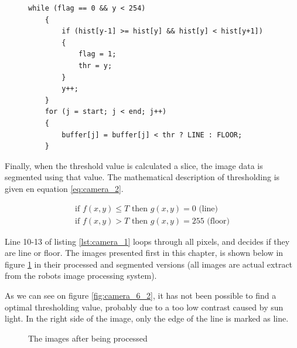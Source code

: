\lstset{language=C,basicstyle=\tiny,numbers=left}
\begin{figure}
\begin{lstlisting}[frame=single,caption=Part of the thresholding code,label=lst:camera_1]
	while (flag == 0 && y < 254)
	{
		if (hist[y-1] >= hist[y] && hist[y] < hist[y+1]) 
		{
			flag = 1;
			thr = y;
		}
		y++;
	}
	for (j = start; j < end; j++)
	{
		buffer[j] = buffer[j] < thr ? LINE : FLOOR;
	}
\end{lstlisting}
\end{figure}

Finally, when the threshold value is calculated a slice, the image data is segmented using that value. The mathematical description of thresholding is given en equation \ref{eq:camera_2}.

\begin{equation}\label{eq:camera_2}
\begin{split}
	\text{if } f(x,y) \leq T \text{ then } g(x,y) = 0 \text{ (line) } \\
	\text{if } f(x,y) > T \text{ then } g(x,y) = 255 \text{ (floor)}
\end{split}
\end{equation}



Line 10-13 of listing \ref{lst:camera_1} loops through all pixels, and decides if they are line or floor. The images presented first in this chapter, is shown below in figure \ref{fig:camera_6} in their processed and segmented versions (all images are actual extract from the robots image processing system).

As we can see on figure \ref{fig:camera_6_2}, it has not been possible to find a optimal thresholding value, probably due to a too low contrast caused by sun light. In the right side of the image, only the edge of the line is marked as line. 

\begin{figure}[!t]
	\centering
	\caption{The images after being processed}
	\label{fig:camera_6}
\end{figure}


